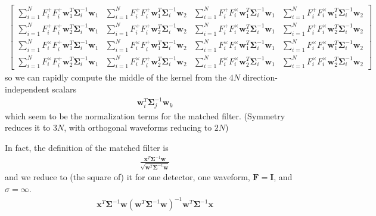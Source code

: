 \documentclass{article}
\begin{document}
\begin{eqnarray}
\left[
\begin{array}{cccc}
\sum_{i=1}^N F_i^+F_i^+\mathbf{w}_1^T\mathbf{\Sigma}_i^{-1}\mathbf{w}_1 &
\sum_{i=1}^N F_i^+F_i^+\mathbf{w}_1^T\mathbf{\Sigma}_i^{-1}\mathbf{w}_2 &
\sum_{i=1}^N F_i^+F_i^\times\mathbf{w}_1^T\mathbf{\Sigma}_i^{-1}\mathbf{w}_1 &
\sum_{i=1}^N F_i^+F_i^\times\mathbf{w}_1^T\mathbf{\Sigma}_i^{-1}\mathbf{w}_2 \\
\sum_{i=1}^N F_i^+F_i^+\mathbf{w}_2^T\mathbf{\Sigma}_i^{-1}\mathbf{w}_1 &
\sum_{i=1}^N F_i^+F_i^+\mathbf{w}_2^T\mathbf{\Sigma}_i^{-1}\mathbf{w}_2 &
\sum_{i=1}^N F_i^+F_i^\times\mathbf{w}_2^T\mathbf{\Sigma}_i^{-1}\mathbf{w}_1 &
\sum_{i=1}^N F_i^+F_i^\times\mathbf{w}_2^T\mathbf{\Sigma}_i^{-1}\mathbf{w}_2 \\
\sum_{i=1}^N F_i^\times F_i^+\mathbf{w}_1^T\mathbf{\Sigma}_i^{-1}\mathbf{w}_1 &
\sum_{i=1}^N F_i^\times F_i^+\mathbf{w}_1^T\mathbf{\Sigma}_i^{-1}\mathbf{w}_2 &
\sum_{i=1}^N F_i^\times F_i^\times\mathbf{w}_1^T\mathbf{\Sigma}_i^{-1}\mathbf{w}_1 &
\sum_{i=1}^N F_i^\times F_i^\times\mathbf{w}_1^T\mathbf{\Sigma}_i^{-1}\mathbf{w}_2 \\
\sum_{i=1}^N F_i^\times F_i^+\mathbf{w}_2^T\mathbf{\Sigma}_i^{-1}\mathbf{w}_1 &
\sum_{i=1}^N F_i^\times F_i^+\mathbf{w}_2^T\mathbf{\Sigma}_i^{-1}\mathbf{w}_2 &
\sum_{i=1}^N F_i^\times F_i^\times\mathbf{w}_2^T\mathbf{\Sigma}_i^{-1}\mathbf{w}_1 &
\sum_{i=1}^N F_i^\times F_i^\times\mathbf{w}_2^T\mathbf{\Sigma}_i^{-1}\mathbf{w}_2
\end{array}
\right]
\end{eqnarray}
so we can rapidly compute the middle of the kernel from the $4N$ direction-independent scalars \begin{eqnarray}
\mathbf{w}_i^T\mathbf{\Sigma}_j^{-1}\mathbf{w}_k
\end{eqnarray}
which seem to be the normalization terms for the matched filter.  (Symmetry reduces it to $3N$, with orthogonal waveforms reducing to $2N$)

In fact, the definition of the matched filter is
\begin{eqnarray}
\frac{\mathbf{x}^T\mathbf{\Sigma}^{-1}\mathbf{w}}{\sqrt{\mathbf{w}^T\mathbf{\Sigma}^{-1}\mathbf{w}}}
\end{eqnarray}
and we reduce to (the square of) it for one detector, one waveform, $\mathbf{F} = \mathbf{I}$, and $\sigma=\infty$.
\begin{eqnarray}
\mathbf{x}^T\mathbf{\Sigma}^{-1}\mathbf{w}(\mathbf{w}^T\mathbf{\Sigma}^{-1}\mathbf{w})^{-1}\mathbf{w}^T\mathbf{\Sigma}^{-1}\mathbf{x}
\end{eqnarray}
\end{document}
